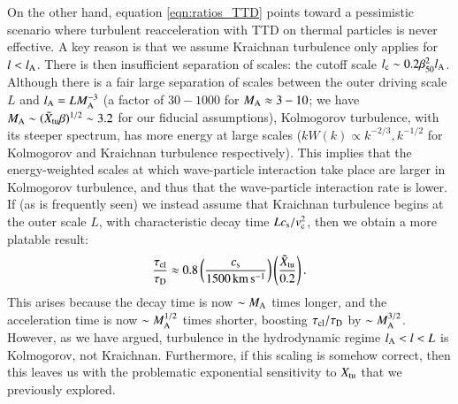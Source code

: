 \documentclass[fleqn,usenatbib,useAMS]{mnras}
\begin{document}
On the other hand, equation \ref{eqn:ratios_TTD} points toward a pessimistic scenario where turbulent reacceleration with TTD on thermal particles is never effective. A key reason is that we assume Kraichnan turbulence only applies for $l< l_{\rm A}$. There is then insufficient separation of scales: the cutoff scale $l_{\rm c} \sim 0.2 \beta_{\rm 50}^{2} l_{\rm A}$. Although there is a fair large separation of scales between the outer driving scale $L$ and $l_{\rm A} = L M_{\rm A}^{-3}$ (a factor of $30-1000$ for $M_{\rm A} \approx 3-10$; we have $M_{\rm A} \sim (\tilde{X}_{\rm tu} \beta)^{1/2} \sim 3.2$ for our fiducial assumptions), Kolmogorov turbulence, with its steeper spectrum, has more energy at large scales ($k W(k) \propto k^{-2/3}, k^{-1/2}$ for Kolmogorov and Kraichnan turbulence respectively). This implies that the energy-weighted scales at which wave-particle interaction take place are larger in Kolmogorov turbulence, and thus that the wave-particle interaction rate is lower. If (as is frequently seen) we instead assume that Kraichnan turbulence begins at the outer scale $L$, with characteristic decay time $L c_{\rm s}/v_{\rm c}^{2}$, then we obtain a more platable result: 
\begin{equation}
\frac{\tau_{\rm cl}}{\tau_{\rm D}} \approx 0.8  \left( \frac{c_{\rm s}}{1500 \, {\rm km \, s^{-1}}} \right) \left( \frac{\tilde{X}_{\rm tu}}{0.2} \right). 
\end{equation}
This arises because the decay time is now $\sim M_{\rm A}$ times longer, and the acceleration time is now $\sim M_{\rm A}^{1/2}$ times shorter, boosting $\tau_{\rm cl}/\tau_{\rm D}$ by $\sim M_{\rm A}^{3/2}$. However, as we have argued, turbulence in the hydrodynamic regime $l_{\rm A} < l < L$ is Kolmogorov, not Kraichnan. Furthermore, if this scaling is somehow correct, then this leaves us with the problematic exponential sensitivity to $X_{\rm tu}$ that we previously explored. 
\end{document}
